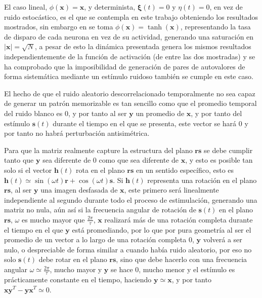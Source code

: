 \documentclass[11pt,a4paper,twoside,pdf]{article}
\numberwithin{equation}{section}
\begin{document}
El caso lineal, \(\phi(\mathbf{x})=\mathbf{x}\), y determinista, \(\bm{\xi}(t) = 0\) y \(\eta(t) = 0\), en vez de ruido estocástico, es el que se contempla en este trabajo obteniendo los resultados mostrados, sin embargo en \parencite{susman2019} se toma \(\phi(\mathbf{x}) = \tanh(\mathbf{x})\), representando la tasa de disparo de cada neurona en vez de su actividad, generando una saturación en \(|\mathbf{x}| = \sqrt{N}\), a pesar de esto la dinámica presentada genera los mismos resultados independientemente de la función de activación (de entre las dos mostradas) y se ha comprobado que la imposibilidad de generación de pares de autovalores de forma sistemática mediante un estímulo ruidoso también se cumple en este caso.

El hecho de que el ruido aleatorio descorrelacionado temporalmente no sea capaz de generar un patrón memorizable es tan sencillo como que el promedio temporal del ruido blanco es 0, y por tanto al ser \(\mathbf{y}\) un promedio de \(\mathbf{x}\), y por tanto del estímulo \(\mathbf{s}(t)\) durante el tiempo en el que se presenta, este vector se hará 0 y por tanto no habrá perturbación antisimétrica.

Para que la matriz realmente capture la estructura del plano \(\mathbf{rs}\) se debe cumplir tanto que \(\mathbf{y}\) sea diferente de 0 como que sea diferente de \(\mathbf{x}\), y esto es posible tan solo si el vector \(\mathbf{h}(t)\) rota en el plano \(\mathbf{rs}\) en un sentido específico, esto es \(\mathbf{h}(t) \simeq \sin(\omega t)\mathbf{r} + \cos(\omega t)\mathbf{s}\). Si \(\mathbf{h}(t)\) representa una rotación en el plano \(\mathbf{rs}\), al ser \(\mathbf{y}\) una imagen desfasada de \(\mathbf{x}\), este primero será linealmente independiente al segundo durante todo el proceso de estimulación, generando una matriz no nula, aún así si la frecuencia angular de rotación de \(\mathbf{s}(t)\) en el plano \(\mathbf{rs}\), \(\omega\) es mucho mayor que \(\frac{2\pi}{\tau}\), \(\mathbf{x}\) realizará más de una rotación completa durante el tiempo en el que \(\mathbf{y}\) está promediando, por lo que por pura geometría al ser el promedio de un vector a lo largo  de una rotación completa 0, \(\mathbf{y}\) volverá a ser nulo, o despreciable de forma similar a cuando había ruido aleatorio, por eso no solo \(\mathbf{s}(t)\) debe rotar en el plano \(\mathbf{rs}\), sino que debe hacerlo con una frecuencia angular \(\omega \simeq \frac{2\pi}{\tau}\), mucho mayor y \(\mathbf{y}\) se hace 0, mucho menor y el estímulo es prácticamente constante en el tiempo, haciendo \(\mathbf{y} \simeq \mathbf{x}\), y por tanto \(\mathbf{xy}^T-\mathbf{yx}^T \simeq 0\).
\end{document}

